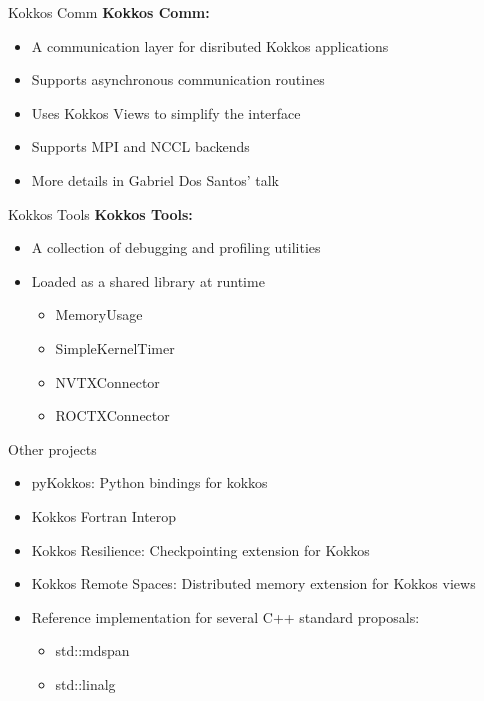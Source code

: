 
\begin{frame}{Kokkos Comm}
    \textbf{Kokkos Comm:}
    \begin{itemize}
        \item A communication layer for disributed Kokkos applications
        \item Supports asynchronous communication routines
        \item Uses Kokkos Views to simplify the interface
        \item Supports MPI and NCCL backends
        \item More details in Gabriel Dos Santos' talk
    \end{itemize}
\end{frame}


\begin{frame}{Kokkos Tools}
    \textbf{Kokkos Tools:}
    \begin{itemize}
        \item A collection of debugging and profiling utilities
        \item Loaded as a shared library at runtime
        \begin{itemize}
            \item MemoryUsage
            \item SimpleKernelTimer
            \item NVTXConnector
            \item ROCTXConnector
        \end{itemize}
    \end{itemize}
\end{frame}


\begin{frame}{Other projects}
    \begin{itemize}
        \item pyKokkos: Python bindings for kokkos
        \item Kokkos Fortran Interop
        \item Kokkos Resilience: Checkpointing extension for Kokkos
        \item Kokkos Remote Spaces: Distributed memory extension for Kokkos views
        \item Reference implementation for several C++ standard proposals:
        \begin{itemize}
            \item std::mdspan
            \item std::linalg
        \end{itemize}
    \end{itemize}
\end{frame}

